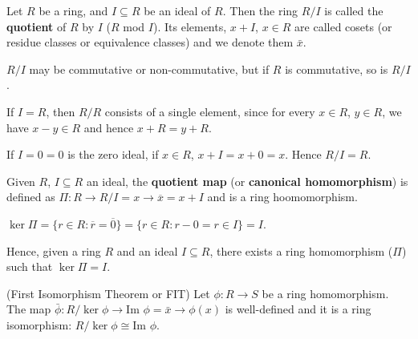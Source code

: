 \begin{definition}
	Let $R$ be a ring, and $I \subseteq R$ be an ideal of $R$. Then the ring $R / I$ is called the \textbf{quotient} of $R$ by $I$ ($R$ mod $I$). Its elements, $x + I$, $x \in R$ are called cosets (or residue classes or equivalence classes) and we denote them $\bar{x}$.
	
	$R / I$ may be commutative or non-commutative, but if $R$ is commutative, so is $R / I$.

	If $I = R$, then $R / R$ consists of a single element, since for every $x \in R$, $y \in R$, we have $x - y \in R$ and hence $x + R = y + R$.

	If $I = 0 = {0}$ is the zero ideal, if $x \in R$, $x + I = x + 0 = x$. Hence $R / I = R$.
\end{definition}

\begin{definition}
	Given $R$, $I \subseteq R$ an ideal, the \textbf{quotient map} (or \textbf{canonical homomorphism}) is defined as $\Pi: R \rightarrow R / I = x \rightarrow \overline{x} = x + I$ and is a ring hoomomorphism.

	$\ker \Pi = \{r \in R: \overline{r} = \overline{0}\} = \{r \in R: r - 0 = r \in I\} = I$.
\end{definition}

Hence, given a ring $R$ and an ideal $I \subseteq R$, there exists a ring homomorphism ($\Pi$) such that $\ker \Pi = I$.

\begin{theorem}
	(First Isomorphism Theorem or FIT) Let $\phi: R \rightarrow S$ be a ring homomorphism. The map $\bar{\phi}: R / \ker \phi \rightarrow \text{Im } \phi = \bar{x} \rightarrow \phi(x)$ is well-defined and it is a ring isomorphism: $R / \ker \phi \cong \text{Im } \phi$.
\end{theorem}

